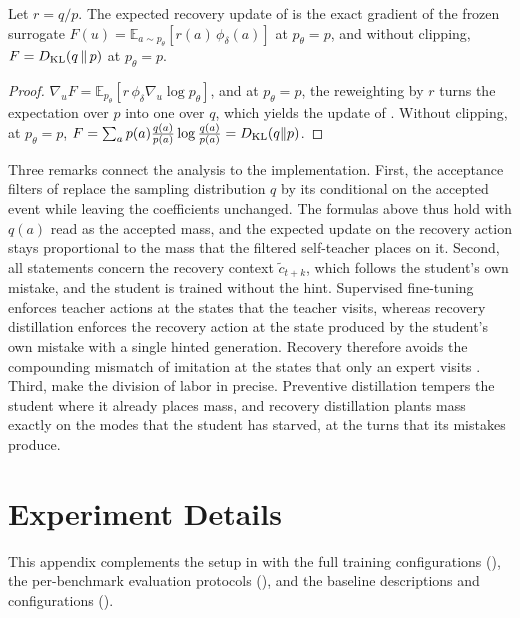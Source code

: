 \begin{lemma}
\label{lem:surrogate}
Let $r = q / p$. The expected recovery update of  is the exact gradient of the frozen surrogate $F(u) = \mathbb{E}_{a \sim p_\theta}\!\left[ r(a)\, \phi_\delta(a) \right]$ at $p_\theta = p$, and without clipping, $F = D_{\mathrm{KL}}(q \,\|\, p)$ at $p_\theta = p$.
\end{lemma}
\begin{proof}
$\nabla_u F = \mathbb{E}_{p_\theta}[r\, \phi_\delta \nabla_u \log p_\theta]$, and at $p_\theta = p$, the reweighting by $r$ turns the expectation over $p$ into one over $q$, which yields the update of . Without clipping, at $p_\theta = p$, $F = \sum_a p(a) \tfrac{q(a)}{p(a)} \log \tfrac{q(a)}{p(a)} = D_{\mathrm{KL}}(q \| p)$.
\end{proof}

Three remarks connect the analysis to the implementation. First, the acceptance filters of  replace the sampling distribution $q$ by its conditional on the accepted event while leaving the coefficients unchanged. The formulas above thus hold with $q(a)$ read as the accepted mass, and the expected update on the recovery action stays proportional to the mass that the filtered self-teacher places on it. Second, all statements concern the recovery context $\tilde{c}_{t+k}$, which follows the student's own mistake, and the student is trained without the hint. Supervised fine-tuning enforces teacher actions at the states that the teacher visits, whereas recovery distillation enforces the recovery action at the state produced by the student's own mistake with a single hinted generation. Recovery therefore avoids the compounding mismatch of imitation at the states that only an expert visits \citep{ross2011reduction}. Third,  make the division of labor in \method{} precise. Preventive distillation tempers the student where it already places mass, and recovery distillation plants mass exactly on the modes that the student has starved, at the turns that its mistakes produce.

\section{Experiment Details}
\label{app:exp_details}

This appendix complements the setup in  with the full training configurations (), the per-benchmark evaluation protocols (), and the baseline descriptions and configurations ().

